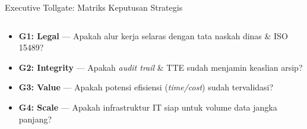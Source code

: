 \documentclass[aspectratio=169,11pt]{beamer}
\begin{document}
\begin{frame}{Executive Tollgate: Matriks Keputusan Strategis}
    \centering
    \begin{columns}
        \centering
        
        \begin{premiumbox}
            \tiny
            \begin{itemize}
                \item[\tikz{\node[draw=plnblue, fill=plnblue!10, inner sep=1pt, minimum size=0.3cm] {\tiny\checkmark};}] \textbf{G1: Legal} --- Apakah alur kerja selaras dengan tata naskah dinas \& ISO 15489?
                \item[\tikz{\node[draw=plnblue, fill=plnblue!10, inner sep=1pt, minimum size=0.3cm] {\tiny\checkmark};}] \textbf{G2: Integrity} --- Apakah \textit{audit trail} \& TTE sudah menjamin keaslian arsip?
                \item[\tikz{\node[draw=plnblue, fill=plnblue!10, inner sep=1pt, minimum size=0.3cm] {\tiny\checkmark};}] \textbf{G3: Value} --- Apakah potensi efisiensi (\textit{time/cost}) sudah tervalidasi?
                \item[\tikz{\node[draw=plnblue, fill=plnblue!10, inner sep=1pt, minimum size=0.3cm] {\tiny\checkmark};}] \textbf{G4: Scale} --- Apakah infrastruktur IT siap untuk volume data jangka panjang?
            \end{itemize}
        \end{premiumbox}
        

\end{columns}
\end{frame}
\end{document}
